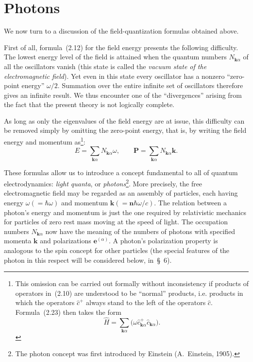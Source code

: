 \section{Photons}

We now turn to a discussion of the field-quantization formulas obtained above.

First of all, formula~(2.12) for the field energy presents the following difficulty. The lowest energy level  of the field is attained when the quantum numbers $N_{\mathbf{k}\alpha}$ of all the oscillators vanish (this state is called the \emph{vacuum state of the electromagnetic field}). Yet even in this state every oscillator has a nonzero ``zero-point energy'' $\omega/2$. Summation over the entire infinite set of oscillators therefore gives an infinite result. We thus encounter one of the ``divergences'' arising from the fact that the present theory is not logically complete.

As long as only the eigenvalues of the field energy are at issue, this difficulty can be removed simply by omitting the zero-point energy, that is, by writing the field energy and momentum as\footnote{This omission can be carried out formally without inconsistency if products of operators in~(2.10) are understood to be ``normal'' products, i.e. products in which the operators $\widehat c^+$ always stand to the left of the operators $\widehat c$. Formula~(2.23) then takes the form
\[
\widehat H=\sum_{\mathbf{k}\alpha}\bigl(\omega\widehat c^+_{\mathbf{k}\alpha}\widehat c_{\mathbf{k}\alpha}\bigr).
\]}:
\begin{equation}
E=\sum_{\mathbf{k}\alpha}N_{\mathbf{k}\alpha}\omega,
\qquad
\mathbf{P}=\sum_{\mathbf{k}\alpha}N_{\mathbf{k}\alpha}\mathbf{k}.
\tag{3.1}
\end{equation}

These formulas allow us to introduce a concept fundamental to all of quantum electrodynamics: \emph{light quanta}, or \emph{photons}\footnote{The photon concept was first introduced by Einstein (A.~Einstein, 1905).}. More precisely, the free electromagnetic field may be regarded as an assembly of particles, each having energy $\omega(=\hbar\omega)$ and momentum $\mathbf{k}(=\mathbf{n}\hbar\omega/c)$. The relation between a photon's energy and momentum is just the one required by relativistic mechanics for particles of zero rest mass moving at the speed of light. The occupation numbers $N_{\mathbf{k}\alpha}$ now have the meaning of the numbers of photons with specified momenta $\mathbf{k}$ and polarizations $\mathbf{e}^{(\alpha)}$. A photon's polarization property is analogous to the spin concept for other particles (the special features of the photon in this respect will be considered below, in~\S~6).

